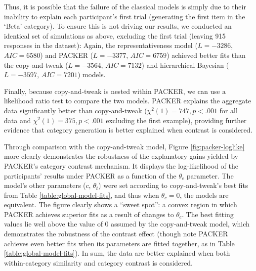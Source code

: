 \documentclass[pdflatex,sn-apa]{sn-jnl}%
\theoremstyle{thmstyleone}%
\theoremstyle{thmstyletwo}%
\theoremstyle{thmstylethree}%
\begin{document}
Thus, it is possible that the failure of the classical models is simply due to
their inability to explain each participant's first trial (generating the first
item in the `Beta' category). To ensure this is not driving our results, we
conducted an identical set of simulations as above, excluding the first trial
(leaving 915 responses in the dataset): Again, the representativeness model ($L
= -3286$, $AIC = 6580$) and PACKER ($L = -3377$,
$AIC = 6759$) achieved better fits than the copy-and-tweak ($L = -3564$,
$AIC = 7132$) and hierarchical Bayesian ($L = -3597$, $AIC = 7201$) models.

Finally, because copy-and-tweak is nested within PACKER, we can use a likelihood
ratio test to compare the two models. PACKER explains the aggregate data
significantly better than copy-and-tweak ($\chi^2(1) = 747, p < .001$ for all
data and $\chi^2(1) = 375, p < .001$ excluding the first example), providing
further evidence that category generation is better explained when contrast is
considered.

Through comparison with the copy-and-tweak model, Figure
\ref{fig:packer-loglike} more clearly demonstrates the robustness of the
explanatory gains yielded by PACKER's category contrast mechanism. It displays
the log-likelihood of the participants' results under PACKER as a function of
the $\theta_c$ parameter. The model's other parameters ($c$,
$\theta_t$) were set according to copy-and-tweak's best fits from Table
\ref{table:global-model-fits}, and thus when $\theta_c=0$, the models are
equivalent. The figure clearly shows a ``sweet spot'': a convex region in which
PACKER achieves superior fits as a result of changes to $\theta_c$. The
best fitting values lie well above the value of 0 assumed by the copy-and-tweak
model, which demonstrates the robustness of the contrast effect (though note
PACKER achieves even better fits when its parameters are fitted together, as in
Table \ref{table:global-model-fits}). In sum, the data are better explained when
both within-category similarity and category contrast is considered.
\end{document}

